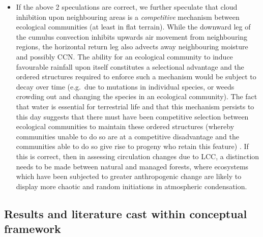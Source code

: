 \begin{itemize}
	\item If the above 2 speculations are correct, we further speculate that cloud inhibition upon neighbouring areas is a \textit{competitive} mechanism between ecological communities (at least in flat terrain). While the downward leg of the cumulus convection inhibits upwards air movement from neighbouring regions, the horizontal return leg also advects away neighbouring moisture and possibly \ac{CCN}. The ability for an ecological community to induce favourable rainfall upon itself constitutes a selectional advantage and the ordered structures required to enforce such a mechanism would be subject to decay over time (e.g.\ due to mutations in individual species, or weeds crowding out and changing the species in an ecological community). The fact that water is essential for terrestrial life and that this mechanism persists to this day suggests that there must have been competitive selection between ecological communities to maintain these ordered structures (whereby communities unable to do so are at a competitive disadvantage and the communities able to do so give rise to progeny who retain this feature) \citep{gorshkov2000}. If this is correct, then in assessing circulation changes due to \ac{LCC}, a distinction needs to be made between natural and managed forests, where ecosystems which have been subjected to greater anthropogenic change are likely to display more chaotic and random initiations in atmospheric condensation.
\end{itemize}

\subsection[Observations cast within framework]{Results and literature cast within conceptual framework}
\label{ssec:model_explain}

